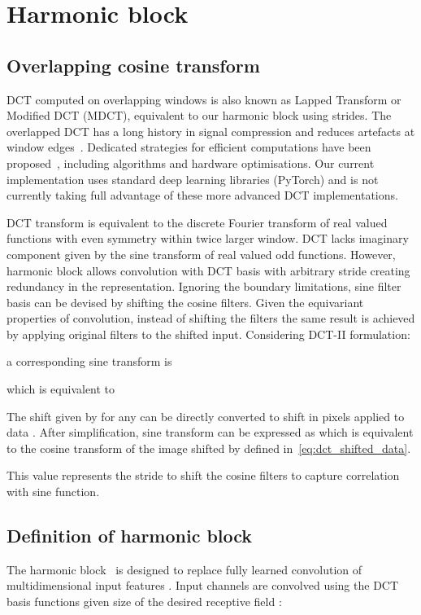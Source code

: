 \documentclass[conference]{IEEEtran}
\begin{document}
\section{Harmonic block}
\label{sec:trans}

\subsection{Overlapping cosine transform} \label{sec:overlap_dct}

DCT computed on overlapping windows is also known as Lapped Transform or Modified DCT (MDCT), equivalent to our harmonic block using strides. The overlapped DCT has a long history in signal compression and reduces artefacts at window edges~\cite{Tran03}. Dedicated strategies for efficient computations have been proposed~\cite{Tran03}, including algorithms and hardware optimisations. Our current implementation uses standard deep learning libraries (PyTorch) and is not currently taking full advantage of these more  advanced  DCT implementations. 

DCT transform is equivalent to the discrete Fourier transform of real valued functions with even symmetry within twice larger window. DCT lacks imaginary component given by the sine transform of real valued odd functions. However, harmonic block allows convolution with DCT basis with arbitrary stride creating redundancy in the representation. Ignoring the boundary limitations, sine filter basis can be devised by shifting the cosine filters. Given the equivariant properties of convolution, instead of shifting the filters the same result is achieved by applying original filters to the shifted input. Considering DCT-II formulation:

a corresponding sine transform is

which is equivalent to

The shift given by  for any  can be directly converted to shift in pixels applied to data . After simplification, sine transform can be expressed as 
which is equivalent to the cosine transform of the image shifted by  defined in~\eqref{eq:dct_shifted_data}. 

This value represents the stride to shift the cosine filters to capture correlation with sine function.

\subsection{Definition of harmonic block} \label{sec:trans/harm_block}
The harmonic block~\cite{Ulicny18} is designed to replace fully learned convolution of multidimensional input features . Input channels  are convolved using the DCT basis functions  given size of the desired receptive field :
\end{document}
